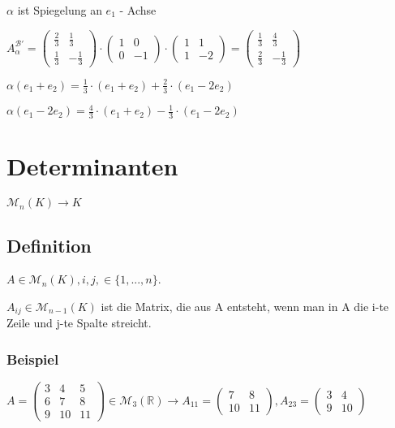 \documentclass[a4paper, openany]{book}
\begin{document}
        \par \medskip

        $\alpha$ ist Spiegelung an $e_1$ - Achse


        \par \medskip

        \par \medskip

        $A_{\alpha}^{\mathcal{B'}} = \begin{pmatrix}\frac{2}{3} & \frac{1}{3} \\ \frac{1}{3} & - \frac{1}{3} \end{pmatrix} \cdot \begin{pmatrix}1 & 0 \\ 0 & -1 \end{pmatrix} \cdot \begin{pmatrix}1 & 1 \\ 1 & -2 \end{pmatrix} = \begin{pmatrix}\frac{1}{3} & \frac{4}{3} \\ \frac{2}{3} & - \frac{1}{3}\end{pmatrix}$

        $\alpha(e_1+e_2) = \frac{1}{3} \cdot (e_1 + e_2) + \frac{2}{3} \cdot (e_1- 2e_2)$

        $\alpha(e_1 - 2e_2) = \frac{4}{3} \cdot (e_1 + e_2) - \frac{1}{3} \cdot (e_1 - 2e_2)$

        \chapter{Determinanten}

        $\mathcal{M}_{n}(K) \longrightarrow K$

        \section{Definition}
        
        $A \in \mathcal{M}_n(K), i,j, \in \{1,...,n\}$.

        $A_{ij} \in \mathcal{M}_{n-1}(K)$ ist die Matrix, die aus A entsteht, wenn man in A die i-te Zeile und j-te Spalte streicht.

        \subsection{Beispiel}

        \begin{center}
          $A = \begin{pmatrix}3 & 4 & 5 \\ 6 & 7 & 8 \\ 9 & 10 & 11 \end{pmatrix} \in \mathcal{M}_3(\mathbb{R}) \longrightarrow A_{11} = \begin{pmatrix}7 & 8 \\ 10 & 11 \end{pmatrix}, A_{23} = \begin{pmatrix}3 & 4 \\ 9 & 10 \end{pmatrix}$
        \end{center}
\end{document}
